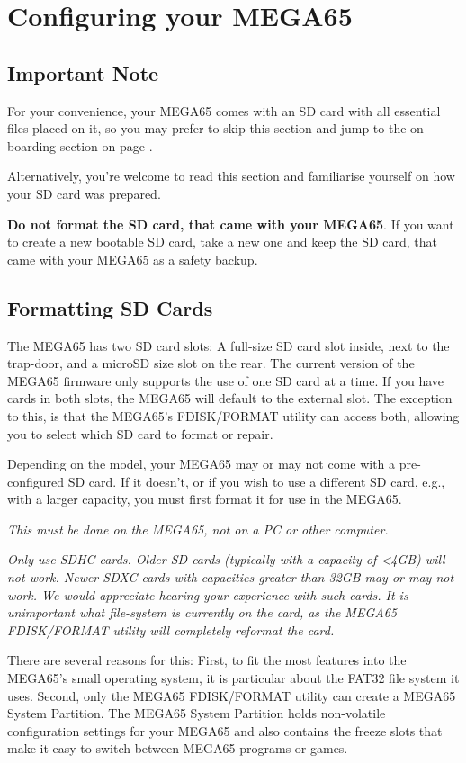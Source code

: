 \chapter{Configuring your MEGA65}
\label{cha:configuring}

\section{Important Note}

For your convenience, your MEGA65 comes with an SD card with all essential
files placed on it, so you may prefer to skip this section and jump to
the on-boarding section on page \pageref{onboarding}.

Alternatively, you're welcome to read this section and familiarise
yourself on how your SD card was prepared.

{\bf Do not format the SD card, that came with your MEGA65}.
If you want to create a new bootable SD card, take a new one
and keep the SD card, that came with your MEGA65 as a safety backup.

\section{Formatting SD Cards}
The MEGA65 has two SD card slots: A full-size SD card slot inside, next to
the trap-door, and a microSD size slot on the rear.  The current version
of the MEGA65 firmware only supports the use of one SD card at a time.
If you have cards in both slots, the MEGA65 will default to the external slot. The exception to this, is that the MEGA65's FDISK/FORMAT
utility can access both, allowing you to select which SD card to format or
repair.

Depending on the model, your MEGA65 may or may not come with a pre-configured SD card. If it doesn't, or if you wish to use a different SD card, e.g., with a
larger capacity, you must first format it for use in the MEGA65.

{\em This must be done on the MEGA65, not on a PC or other computer.}

{\em Only use SDHC cards. Older SD cards (typically with
  a capacity of <4GB) will not work. Newer SDXC cards with
  capacities greater than 32GB may or may not work. We would
  appreciate hearing your experience with such cards. It is unimportant
  what file-system is currently on the card, as the MEGA65
  FDISK/FORMAT utility will completely reformat the card.}

There are several reasons for this: First, to fit the most
features into the MEGA65's small operating system, it is
particular about the FAT32 file system it uses. Second, only the
MEGA65 FDISK/FORMAT utility can create a MEGA65 System Partition. The
MEGA65 System Partition holds non-volatile configuration settings for
your MEGA65 and also contains the freeze slots that make it easy to
switch between MEGA65 programs or games.

